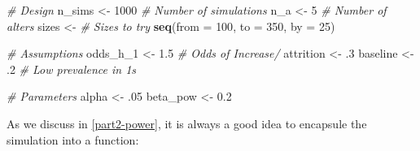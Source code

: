 \documentclass[]{book}
\newenvironment{Shaded}{\begin{snugshade}}{\end{snugshade}}
\newcommand{\CommentTok}[1]{\textcolor[rgb]{0.56,0.35,0.01}{\textit{#1}}}
\newcommand{\DataTypeTok}[1]{\textcolor[rgb]{0.13,0.29,0.53}{#1}}
\newcommand{\DecValTok}[1]{\textcolor[rgb]{0.00,0.00,0.81}{#1}}
\newcommand{\FloatTok}[1]{\textcolor[rgb]{0.00,0.00,0.81}{#1}}
\newcommand{\KeywordTok}[1]{\textcolor[rgb]{0.13,0.29,0.53}{\textbf{#1}}}
\newcommand{\NormalTok}[1]{#1}
\newcommand{\StringTok}[1]{\textcolor[rgb]{0.31,0.60,0.02}{#1}}
\begin{document}
\begin{Shaded}
\begin{Highlighting}[]
\CommentTok{# Design}
\NormalTok{n_sims    <-}\StringTok{ }\DecValTok{1000} \CommentTok{# Number of simulations}
\NormalTok{n_a       <-}\StringTok{ }\DecValTok{5}   \CommentTok{# Number of alters}
\NormalTok{sizes     <-}\StringTok{     }\CommentTok{# Sizes to try}
\StringTok{  }\KeywordTok{seq}\NormalTok{(}\DataTypeTok{from =} \DecValTok{100}\NormalTok{, }\DataTypeTok{to =} \DecValTok{350}\NormalTok{, }\DataTypeTok{by =} \DecValTok{25}\NormalTok{)}

\CommentTok{# Assumptions}
\NormalTok{odds_h_}\DecValTok{1}\NormalTok{  <-}\StringTok{ }\FloatTok{1.5} \CommentTok{# Odds of Increase/}
\NormalTok{attrition <-}\StringTok{ }\FloatTok{.3}
\NormalTok{baseline  <-}\StringTok{ }\FloatTok{.2}  \CommentTok{# Low prevalence in 1s}

\CommentTok{# Parameters}
\NormalTok{alpha    <-}\StringTok{ }\FloatTok{.05}
\NormalTok{beta_pow <-}\StringTok{ }\FloatTok{0.2}
\end{Highlighting}
\end{Shaded}

As we discuss in \ref{part2-power}, it is always a good idea to encapsule the simulation into a function:
\end{document}
